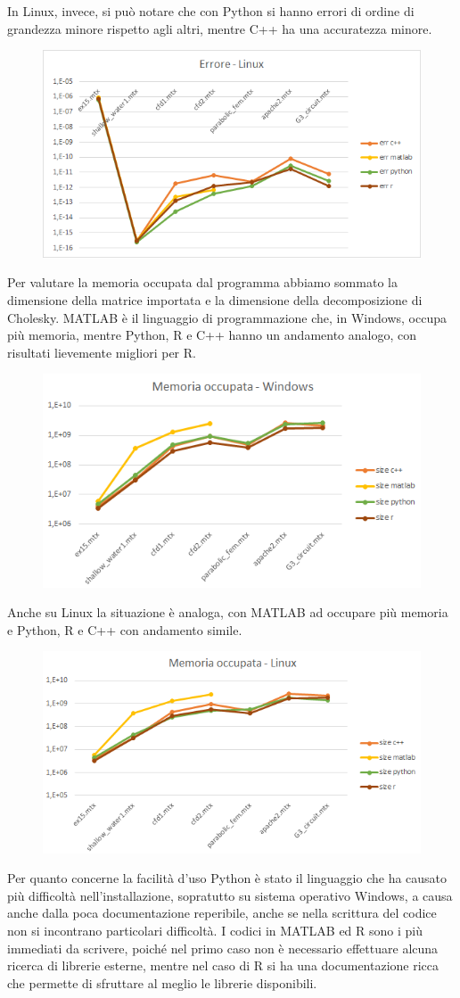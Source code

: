 \documentclass[a4paper,10pt]{article}
\begin{document}
In Linux, invece, si può notare che con Python si hanno errori di ordine di grandezza minore rispetto agli altri, mentre C++ ha una accuratezza minore.
 
\begin{figure}[H]
\centering
  \includegraphics[width=0.5\linewidth]{img/errlinux.png}
\end{figure}

Per valutare la memoria occupata dal programma abbiamo sommato la dimensione della matrice importata e la dimensione della decomposizione di Cholesky. MATLAB è il linguaggio di programmazione che, in Windows, occupa più memoria, mentre Python, R e C++ hanno un andamento analogo, con risultati lievemente migliori per R.

\begin{figure}[H]
\centering
  \includegraphics[width=0.5\linewidth]{img/memoccwin.png}
\end{figure}

Anche su Linux la situazione è analoga, con MATLAB ad occupare più memoria e Python, R e C++ con andamento simile.

\begin{figure}[H]
\centering
  \includegraphics[width=0.5\linewidth]{img/memocclinux.png}
\end{figure}


Per quanto concerne la facilità d'uso Python è stato il linguaggio che ha causato più difficoltà nell'installazione, sopratutto su sistema operativo Windows, a causa anche dalla poca documentazione reperibile, anche se nella scrittura del codice non si incontrano particolari difficoltà. %
I codici in MATLAB ed R sono i più immediati da scrivere, poiché nel primo caso non è necessario effettuare alcuna ricerca di librerie esterne, mentre nel caso di R si ha una documentazione ricca che permette di sfruttare al meglio le librerie disponibili.
\end{document}
